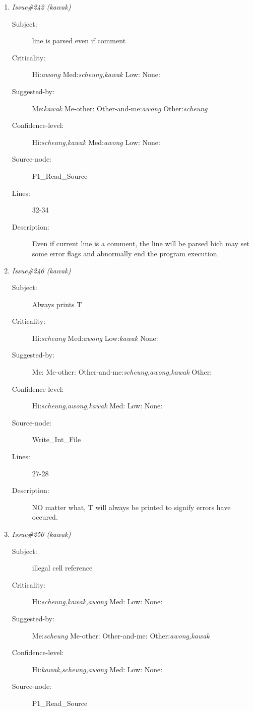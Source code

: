\begin{enumerate}
\begin{description}
\item [Lines:] 49-51

\item [Description:] Because i is assigned to j, and I may be as high as 65, this for loop may
never begin.
\end{description}
\item {\it Issue\#242 (kawak)}
\begin{description}
\item [Subject:] line is parsed even if comment
\item [Criticality:] Hi:{\it awong} Med:{\it scheung,kawak} Low:{\it } None:{\it }
\item [Suggested-by:] Me:{\it kawak} Me-other:{\it } Other-and-me:{\it awong} Other:{\it scheung}
\item [Confidence-level:] Hi:{\it scheung,kawak} Med:{\it awong} Low:{\it } None:{\it }
\item [Source-node:] P1\_Read\_Source

\item [Lines:] 32-34

\item [Description:] Even if current line is a comment, the line will be parsed hich may set some
error flags and abnormally end the program execution.
\end{description}
\item {\it Issue\#246 (kawak)}
\begin{description}
\item [Subject:] Always prints T
\item [Criticality:] Hi:{\it scheung} Med:{\it awong} Low:{\it kawak} None:{\it }
\item [Suggested-by:] Me:{\it } Me-other:{\it } Other-and-me:{\it scheung,awong,kawak} Other:{\it }
\item [Confidence-level:] Hi:{\it scheung,awong,kawak} Med:{\it } Low:{\it } None:{\it }
\item [Source-node:] Write\_Int\_File

\item [Lines:] 27-28

\item [Description:] NO matter what, T will always be printed to signify errors have occured.
\end{description}
\item {\it Issue\#250 (kawak)}
\begin{description}
\item [Subject:] illegal cell reference
\item [Criticality:] Hi:{\it scheung,kawak,awong} Med:{\it } Low:{\it } None:{\it }
\item [Suggested-by:] Me:{\it scheung} Me-other:{\it } Other-and-me:{\it } Other:{\it awong,kawak}
\item [Confidence-level:] Hi:{\it kawak,scheung,awong} Med:{\it } Low:{\it } None:{\it }
\item [Source-node:] P1\_Read\_Source


\end{description}
\end{enumerate}
